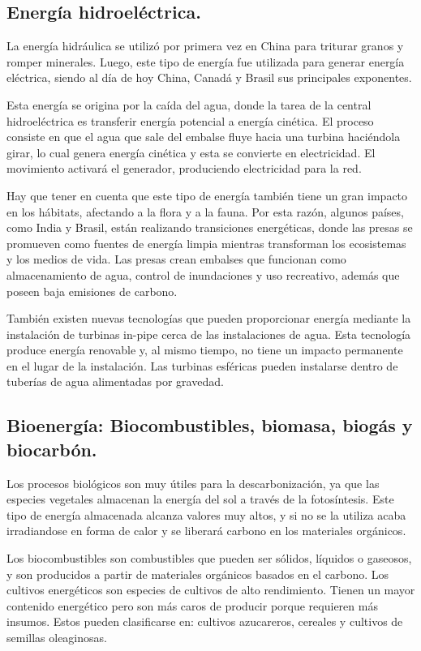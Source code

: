 \documentclass[runningheads]{llncs}
\begin{document}
\subsection{Energía hidroeléctrica.}

La energía hidráulica se utilizó por primera vez en China para triturar granos y romper minerales. Luego, este tipo de energía fue utilizada para generar energía eléctrica, siendo al día de hoy China, Canadá y Brasil sus principales exponentes.

Esta energía se origina por la caída del agua, donde la tarea de la central hidroeléctrica es transferir energía potencial a energía cinética. El proceso consiste en que el agua que sale del embalse fluye hacia una turbina haciéndola girar, lo cual  genera energía cinética y esta se convierte en electricidad. El movimiento activará el generador, produciendo electricidad para la red.

Hay que tener en cuenta que este tipo de energía también tiene un gran impacto en los hábitats, afectando a la flora y a la fauna. Por esta razón, algunos países, como India y Brasil, están realizando transiciones energéticas, donde las presas se promueven como fuentes de energía limpia mientras transforman los ecosistemas y los medios de vida. Las presas crean embalses que funcionan como almacenamiento de agua, control de inundaciones y uso recreativo, además que poseen baja emisiones de carbono.

También existen nuevas tecnologías que pueden proporcionar energía mediante la instalación de turbinas in-pipe cerca de las instalaciones de agua. Esta tecnología produce energía renovable y, al mismo tiempo, no tiene un impacto permanente en el lugar de la instalación. Las turbinas esféricas pueden instalarse dentro de tuberías de agua alimentadas por gravedad.

\subsection{Bioenergía: Biocombustibles, biomasa, biogás y biocarbón.
}

Los procesos biológicos son muy útiles para la descarbonización, ya que las especies vegetales almacenan la energía del sol a través de la fotosíntesis. Este tipo de energía almacenada alcanza valores muy altos, y si no se la utiliza acaba irradiandose en forma de calor y se liberará carbono en los materiales orgánicos.


Los biocombustibles son combustibles que pueden ser sólidos, líquidos o gaseosos, y son producidos a partir de materiales orgánicos basados en el carbono. Los cultivos energéticos son especies de cultivos de alto rendimiento. Tienen un mayor contenido energético pero son más caros de producir porque requieren más insumos. Estos pueden clasificarse en: cultivos azucareros, cereales y cultivos de semillas oleaginosas. 
\end{document}
